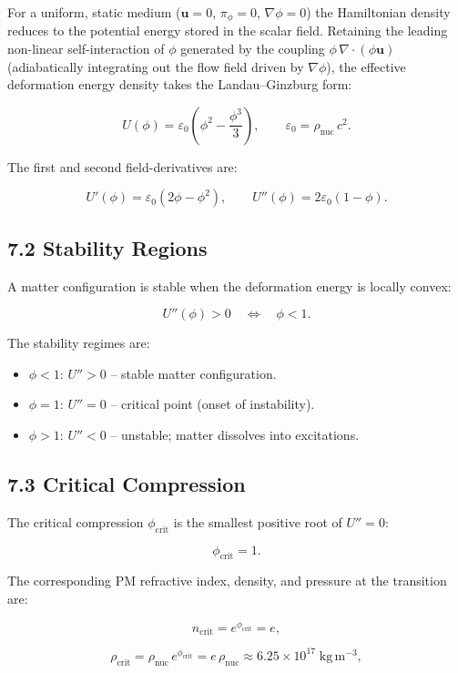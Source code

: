 \documentclass{article}
\begin{document}
For a uniform, static medium ($\mathbf u = 0$, $\pi_\phi = 0$,
$\nabla\phi = 0$) the Hamiltonian density reduces to the potential energy
stored in the scalar field.  Retaining the leading non-linear self-interaction
of $\phi$ generated by the coupling $\phi\,\nabla\cdot(\phi\mathbf u)$
(adiabatically integrating out the flow field driven by $\nabla\phi$), the
effective deformation energy density takes the Landau--Ginzburg form:


\[
U(\phi)
=
\varepsilon_0\!\left(\phi^2 - \frac{\phi^3}{3}\right),
\qquad
\varepsilon_0 = \rho_{\mathrm{nuc}}\,c^2.
\]


The first and second field-derivatives are:


\[
U'(\phi) = \varepsilon_0(2\phi - \phi^2),
\qquad
U''(\phi) = 2\varepsilon_0(1 - \phi).
\]


\subsection*{7.2 Stability Regions}

A matter configuration is stable when the deformation energy is locally convex:


\[
U''(\phi) > 0
\quad\Longleftrightarrow\quad
\phi < 1.
\]


The stability regimes are:

\begin{itemize}
    \item $\phi < 1$: $U'' > 0$ -- stable matter configuration.
    \item $\phi = 1$: $U'' = 0$ -- critical point (onset of instability).
    \item $\phi > 1$: $U'' < 0$ -- unstable; matter dissolves into excitations.
\end{itemize}

\subsection*{7.3 Critical Compression}

The critical compression $\phi_{\mathrm{crit}}$ is the smallest positive root of $U'' = 0$:


\[
\phi_{\mathrm{crit}} = 1.
\]


The corresponding PM refractive index, density, and pressure at the transition are:


\[
n_{\mathrm{crit}} = e^{\phi_{\mathrm{crit}}} = e,
\]


\[
\rho_{\mathrm{crit}}
= \rho_{\mathrm{nuc}}\,e^{\phi_{\mathrm{crit}}}
= e\,\rho_{\mathrm{nuc}}
\approx 6.25\times10^{17}\;\mathrm{kg\,m^{-3}},
\]
\end{document}
